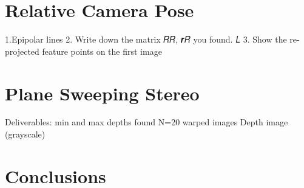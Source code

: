 \documentclass[a4paper]{article}
\begin{document}
\FloatBarrier

\section{Relative Camera Pose}
1.Epipolar lines
2. Write down the matrix 𝑅𝑅, 𝒓𝑅 you found. 𝐿
 3. Show the re-projected feature points on the first image
\section{Plane Sweeping Stereo}

Deliverables:
min and max depths found
N=20 warped images
Depth image (grayscale)
\section{Conclusions}
\end{document}
